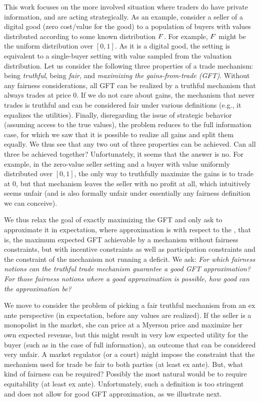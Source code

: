 This work focuses on the more involved situation where traders do have private information, and are acting strategically. As an example, consider a seller of a digital good (zero cost/value for the good) to a population of buyers with values distributed according to some known distribution $F$. For example, $F$ might be the uniform distribution over $[0,1]$. As it is a digital good, the setting is equivalent to a single-buyer setting with value sampled from the valuation distribution. Let us consider the following three properties of a trade mechanism: being \emph{truthful}, being \emph{fair}, and \emph{maximizing the gains-from-trade (GFT)}. Without any fairness considerations, all GFT can be realized by a truthful mechanism that always trades at price 0. If we do not care about gains, the mechanism that never trades is truthful and can be considered fair under various definitions (e.g., it equalizes the utilities). Finally, disregarding the issue of strategic behavior (assuming access to the true values), the problem reduces to the full information case, for which we saw that it is possible to realize all gains and split them equally. We thus see that any two out of three properties can be achieved. Can all three be achieved together? Unfortunately, it seems that the answer is no. For example, in the zero-value seller setting and a buyer with value uniformly distributed over $[0,1]$, the only way to truthfully maximize the gains is to trade at 0, but that mechanism leaves the seller with no profit at all, which intuitively seems unfair (and is also formally unfair under essentially any fairness definition we can conceive). 

We thus relax the goal of exactly maximizing the GFT and only ask to approximate it in expectation, where approximation is with respect to {the {\SecondBest}, that is, the} maximum expected GFT {achievable by a mechanism} without fairness constraints, but with incentive constraints as well as 
participation constraints and the constraint of the mechanism not running a deficit. We ask:   
\emph{For which fairness notions can the truthful trade mechanism guarantee a good GFT approximation? For those fairness notions where a good approximation is possible, how good can the approximation be?}

We move to consider the problem {of picking a fair truthful mechanism} from an ex ante perspective (in expectation, before any values are realized). If the seller is a monopolist in the market, she can price at a Myerson price and maximize her own expected revenue, but this might result in very low expected utility for the buyer (such as in the case of full information), an outcome that can be considered very unfair. A market regulator (or a court) might impose the constraint that the mechanism used for trade be fair to both parties (at least ex ante). But, what kind of fairness can be required? Possibly the most natural would be to require equitability (at least ex ante). Unfortunately, such a definition is too stringent and does not allow for good GFT approximation, as we illustrate next.     

